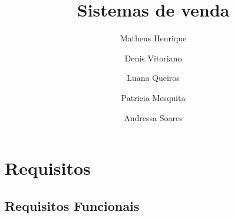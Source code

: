 \documentclass[a4paper,12pt]{report}
\title{Sistemas de venda}
\date{}
\author[1]{Matheus Henrique}
\author[1]{Denis Vitoriano}
\author[1]{Luana Queiros}
\author[1]{Patricia Mesquita}
\author[1]{Andressa Soares}
\affil[1]{Instituto Federal Goiano - Campus Ceres}
\begin{document}
 \maketitle
 \chapter{Requisitos}
 \section{Requisitos Funcionais}
	
\end{document}
